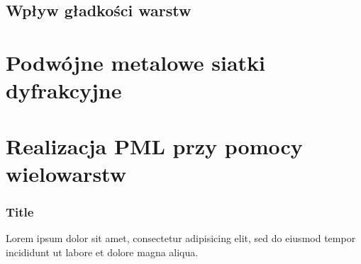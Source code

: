 \documentclass{beamer}
\begin{document}
\subsection{Wpływ gładkości warstw}



\section{Podwójne metalowe siatki dyfrakcyjne}

\section{Realizacja PML przy pomocy wielowarstw}


\begin{frame}
\frametitle{Title}
Lorem ipsum dolor sit amet, consectetur adipisicing elit, sed do eiusmod tempor incididunt ut labore et dolore magna aliqua.
\end{frame}
\end{document}
